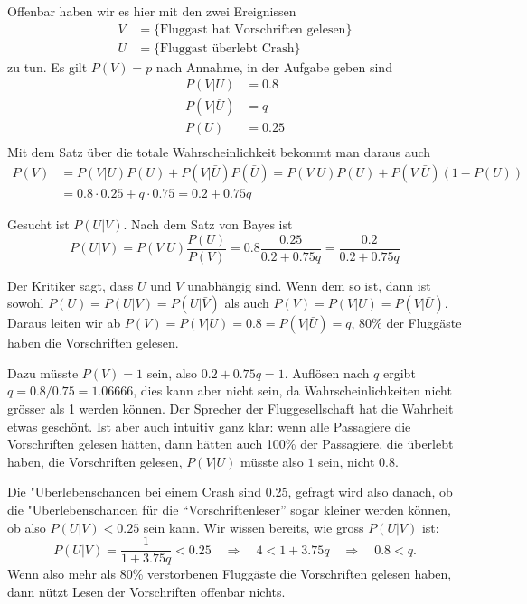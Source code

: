 \begin{loesung}
Offenbar haben wir es hier mit den zwei Ereignissen
\begin{align*}
V&=\{\text{Fluggast hat Vorschriften gelesen}\}
\\
U&=\{\text{Fluggast überlebt Crash}\}
\end{align*}
zu tun. Es gilt $P(V)=p$ nach Annahme, in der Aufgabe geben sind
\begin{align*}
P(V|U)&=0.8\\
P(V|\bar U)&=q\\
P(U)&=0.25\\
\end{align*}
Mit dem Satz über die totale Wahrscheinlichkeit bekommt man daraus auch
\begin{align*}
P(V)
&=
P(V|U)P(U)+P(V|\bar U)P(\bar U)
=
P(V|U)P(U)+P(V|\bar U)(1-P(U))
\\
&=
0.8\cdot0.25 +q\cdot 0.75
=0.2+ 0.75q
\end{align*}
\begin{teilaufgaben}
\item
Gesucht ist $P(U|V)$.
Nach dem Satz von Bayes ist
\begin{equation}
P(U|V)=P(V|U)\frac{P(U)}{P(V)}
=0.8 \frac{0.25}{0.2+0.75q}
=\frac{0.2}{0.2+0.75q}
\label{pq}
\end{equation}
\item
Der Kritiker sagt, dass $U$ und $V$ unabhängig sind. Wenn dem so
ist, dann ist sowohl
$P(U)=P(U|V)=P(U|\bar V)$
als auch
$P(V)=P(V|U)=P(V|\bar U)$.
Daraus leiten wir ab $P(V)=P(V|U)=0.8=P(V|\bar U)=q$, 80\% der
Fluggäste haben die Vorschriften gelesen.
\item
Dazu müsste $P(V)=1$ sein, also
$0.2+0.75q=1$.
Auflösen nach $q$ ergibt $q=0.8/0.75=1.06666$, dies kann aber nicht
sein, da Wahrscheinlichkeiten nicht grösser als 1 werden können.
Der Sprecher der Fluggesellschaft hat die Wahrheit etwas geschönt.
Ist aber auch intuitiv ganz klar: wenn alle Passagiere die Vorschriften
gelesen hätten, dann hätten auch 100\% der Passagiere, die
überlebt haben, die Vorschriften gelesen, $P(V|U)$ müsste also $1$
sein, nicht $0.8$.
\item
Die "Uberlebenschancen bei einem Crash sind 0.25, gefragt wird
also danach, ob die "Uberlebenschancen für die ``Vorschriftenleser''
sogar kleiner werden können, ob also $P(U|V)<0.25$ sein kann. Wir
wissen bereits, wie gross
$P(U|V)$ ist:
\[
P(U|V)=\frac{1}{1+3.75q}<0.25
\quad
\Rightarrow
\quad
4<1+3.75q
\quad
\Rightarrow
\quad
0.8<q.
\]
Wenn also mehr als 80\% verstorbenen Fluggäste die Vorschriften
gelesen haben, dann nützt Lesen der Vorschriften offenbar
nichts.
\qedhere
\end{teilaufgaben}
\end{loesung}

